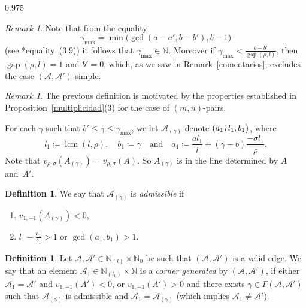 \documentclass[reqno,a4paper,twoside]{amsart}
\theoremstyle{definition}
\newtheorem{definition}[theorem]{Definition}
\theoremstyle{remark}
\newtheorem{remark}[theorem]{Remark}
\DeclareMathOperator{\gap}{gap}
\DeclareMathOperator{\lcm}{lcm}
\newcommand{\wrs}{\hspace{-0.9pt}\wr\hspace{-0.9pt}}
\begin{document}
\begin{spacing}{0.975}
\begin{remark}\label{simple} Note that from the equality
$$
\gamma_{\max}=\min\bigl(\gcd(a-a',b-b'),b-1\bigr)
$$
(see \cite{GGV2}*{equality~(3.9)}) it follows that $\gamma_{\max}\in \mathds{N}$. Moreover if $\gamma_{\max} < \frac{b-b'}{\gap(\rho,l)}$, then $\gap(\rho,l) = 1$ and $b'= 0$, which, as we saw in Remark~\ref{comentarios}, excludes the case $(\mathcal{A},\mathcal{A}')$ simple.
\end{remark}

\begin{remark}
The previous definition is motivated by the properties established in Proposition~\ref{multiplicidad}(3) for the case of $(m,n)$-pairs.
\end{remark}

For each $\gamma$ such that  $b'\le \gamma \le \gamma_{\max}$, we let $\mathcal{A_{(\gamma)}}$ denote $(a_1\wrs l_1,b_1\bigr)$, where
$$
l_1\coloneqq \lcm(l,\rho),\quad b_1 \coloneqq \gamma\quad\text{and}\quad a_1\coloneqq \frac{al_1}{l} + (\gamma-b)\frac{-\sigma l_1}{\rho}.
$$
Note that $v_{\rho,\sigma}(A_{(\gamma)}) = v_{\rho,\sigma}(A)$. So $A_{(\gamma)}$ is in the line determined by $A$ and~$A'$.

\begin{definition}\label{admisible}
We say that $\mathcal{A_{(\gamma)}}$ is {\em admissible} if

\begin{enumerate}[itemsep=0.5ex,topsep=0.5ex]

\item $v_{1,-1}(A_{(\gamma)})<0$,

\item $l_1-\frac{a_1}{b_1}>1$ or $\gcd(a_1,b_1)>1$.

\end{enumerate}
\end{definition}

\begin{definition}\label{generated}
Let $\mathcal{A},\mathcal{A}'\in \mathds{N}_{\!(l)}\times \mathds{N}_0$ be such that $(\mathcal{A},\mathcal{A}')$ is a valid edge. We say that an element $\mathcal{A}_1\in \mathds{N}_{\!(l_1)}\times \mathds{N}$ is a {\em corner generated} by $(\mathcal{A},\mathcal{A}')$, if either $\mathcal{A}_1=\mathcal{A}'$ and $v_{1,-1}(A')<0$, or $v_{1,-1}(A')>0$ and there exists $\gamma\in \Gamma(\mathcal{A},\mathcal{A}')$ such that $\mathcal{A}_{(\gamma)}$ is admissible and $\mathcal{A}_1=\mathcal{A}_{(\gamma)}$ (which implies $\mathcal{A}_1\ne \mathcal{A}'$).
\end{definition}


\end{spacing}
\end{document}
